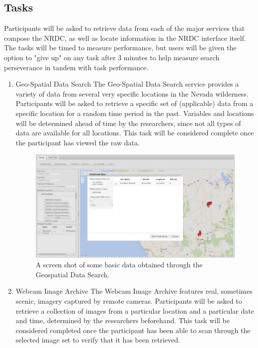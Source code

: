 \documentclass{article}
\begin{document}
%
\subsection{Tasks}
Participants will be asked to retrieve data from each of the major services that compose the NRDC, as well as locate information in the NRDC interface itself. The tasks will be timed to measure performance, but users will be given the option to "give up" on any task after 3 minutes to help measure search perseverance in tandem with task performance.

\begin{enumerate}
\item Geo-Spatial Data Search
The Geo-Spatial Data Search service provides a variety of data from several very specific locations in the Nevada wilderness. Participants will be asked to retrieve a specific set of (applicable) data from a specific location for a random time period in the past. Variables and locations will be determined ahead of time by the researchers, since not all types of data are available for all locations. This task will be considered complete once the participant has viewed the raw data.
    
\begin{figure}[h!]
  \centering
  \includegraphics[width=.6\linewidth]{geospatial}
  \caption{A screen shot of some basic data obtained through the Geospatial Data Search.}
  \label{fig:geospatial}
\end{figure}

\item Webcam Image Archive
The Webcam Image Archive features real, sometimes scenic, imagery captured by remote cameras. Participants will be asked to retrieve a collection of images from a particular location and a particular date and time, determined by the researchers beforehand. This task will be considered completed once the participant has been able to scan through the selected image set to verify that it has been retrieved.


\end{enumerate}
\end{document}
